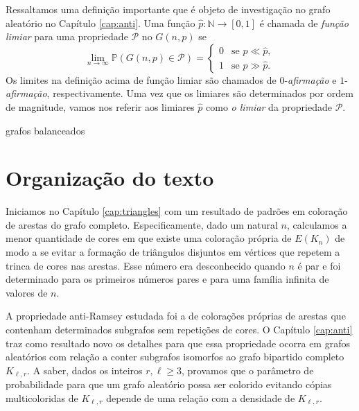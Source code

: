 \documentclass[12pt,a4paper]{book}
\newcommand{\K}{K_{\ell,r}} %
\def\cP{{\mathcal P}}
\def\cP{{\mathcal P}}
\begin{document}
Ressaltamos uma definição importante que é objeto de investigação no grafo aleatório no Capítulo \ref{cap:anti}.
Uma função $\hat{p}: \mathbb{N} \rightarrow [0,1]$ é chamada de \textit{função limiar} para uma propriedade
$\cP$ no $G(n,p)$ se 
\[
  \lim_{n\to\infty}\mathbb{P}\left(G(n,p) \in \cP\right)
  =
  \begin{cases}0&\text{se }p \ll \hat p, \\
    1&\text{se }p \gg \hat p.
  \end{cases}
\]
Os limites na definição acima de função limiar são chamados de $0$-\emph{afirmação} e $1$-\emph{afirmação}, respectivamente. 
Uma vez que os limiares são determinados por ordem de magnitude, vamos nos referir aos limiares $\hat{p}$ como \emph{o limiar} da propriedade $\cP$.

grafos balanceados



\section{Organização do texto}

Iniciamos no Capítulo \ref{cap:triangles} com  um resultado de padrões em coloração de arestas do grafo completo. 
Especificamente, dado um natural $n$, calculamos a menor 
quantidade de cores em que existe uma coloração própria de $E(K_n)$ de modo a se evitar a formação de triângulos disjuntos em vértices que repetem a trinca de cores nas arestas.
Esse número era desconhecido quando $n$ é par e foi determinado para os primeiros números pares e para uma família infinita de valores de $n$.


A propriedade anti-Ramsey estudada foi a de colorações próprias de arestas que contenham determinados subgrafos sem repetições de cores. 
 O Capítulo \ref{cap:anti} traz como resultado novo os detalhes para que essa propriedade ocorra em grafos aleatórios com relação a conter subgrafos  isomorfos ao grafo bipartido completo $\K$. 
A saber, dados os inteiros $r,\ell \geq 3$, provamos que o parâmetro de probabilidade para que um grafo aleatório possa ser colorido evitando cópias multicoloridas de $\K$ depende de uma relação com a densidade de $\K$.
\end{document}
